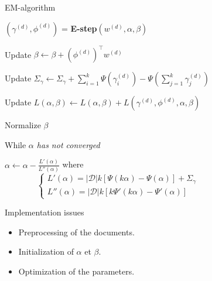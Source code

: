 \documentclass[final]{beamer}
\newlength{\sepwid}
\newlength{\onecolwid}
\newlength{\twocolwid}
\begin{document}
\begin{frame}[t]
\begin{columns}[t]
\begin{column}{\twocolwid}
\begin{columns}[t,totalwidth=\twocolwid]
\begin{column}{\onecolwid}
\begin{block}{EM-algorithm}
{{\quad\quad $(\gamma^{(d)}, \phi^{(d)})$ = \textbf{E-step}$(w^{(d)}, \alpha, \beta)$

\quad\quad Update $\beta \leftarrow \beta + (\phi^{(d)})^{\top}w^{(d)}$

\quad\quad Update $\Sigma_{\gamma} \leftarrow \Sigma_{\gamma} + \sum_{i=1}^k \Psi (\gamma_i^{(d)}) - \Psi\left( \sum_{j=1}^k \gamma_j^{(d)}\right)$

\quad\quad Update $L(\alpha, \beta) \leftarrow L(\alpha, \beta) +L(\gamma^{(d)}, \phi^{(d)}, \alpha, \beta)$
}

\quad Normalize $\beta$ 

\quad While {\emph{$\alpha$ has not converged}}{

\quad \quad $\alpha \leftarrow \alpha - \frac{L'(\alpha)}{L''(\alpha)}$ where \[ \begin{cases}L'(\alpha) = |\mathcal{D}| k \left[ \Psi\left( k \alpha \right) - \Psi(\alpha)\right] + \Sigma_{\gamma} \\
L''(\alpha) = |\mathcal{D}|k [k\Psi'(k\alpha) - \Psi' \left( \alpha\right)] \end{cases} \]

}
}
\end{block}

\begin{block}{Implementation issues}
\begin{itemize}
  \item Preprocessing of the documents.
  \item Initialization of $\alpha$ et $\beta$.
  \item Optimization of the parameters.
\end{itemize}
\end{block}


\end{column} %

\end{columns} %

\end{column} %

\begin{column}{\sepwid}\end{column} %

\begin{column}{\onecolwid} %


\end{column}
\end{columns}
\end{frame}
\end{document}

